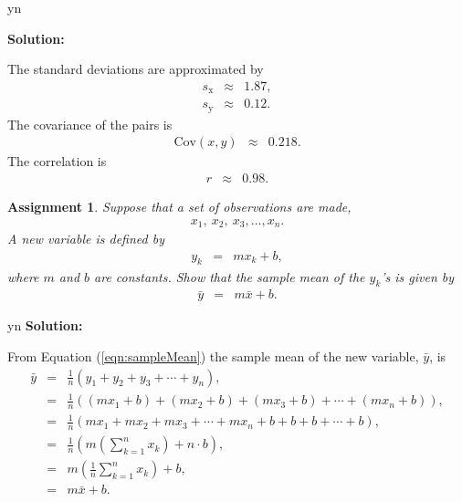 \documentclass[12pt]{article}
\def\solutions{y}
\def\solutions{n}
\newtheorem{assignment}{Assignment}[section]
\newcommand{\lp}{\left(}
\newcommand{\rp}{\right)}
\begin{document}
\if y\solutions

\textbf{Solution:}

The standard deviations are approximated by
\begin{eqnarray*}
  s_{\mathrm x} & \approx & 1.87, \\
  s_{\mathrm y} & \approx & 0.12.
\end{eqnarray*}
The covariance of the pairs is
\begin{eqnarray*}
  \mathrm{Cov}(x,y) & \approx & 0.218.
\end{eqnarray*}
The correlation is
\begin{eqnarray*}
  r & \approx & 0.98.
\end{eqnarray*}

\fi


\begin{assignment}
  Suppose that a set of observations are made,
  \begin{eqnarray*}
    x_1,~x_2,~x_3,\ldots,x_n.
  \end{eqnarray*}
  A new variable is defined by
  \begin{eqnarray*}
    y_k & = & m x_k + b,
  \end{eqnarray*}
  where $m$ and $b$ are constants. Show that the sample mean of the
  $y_k$'s is given by
  \begin{eqnarray*}
    \bar{y} & = & m \bar{x} + b.
  \end{eqnarray*}
\end{assignment}

\if y\solutions
\textbf{Solution:} 

From Equation (\ref{eqn:sampleMean}) the sample mean of the
new variable, $\bar{y}$, is
\begin{eqnarray*}
  \bar{y} & = & \frac{1}{n} (y_1 + y_2 + y_3 + \cdots + y_n), \\
  & = & \frac{1}{n} \lp (m x_1 + b) + (m x_2 + b) + (m x_3 + b) +
  \cdots + (m x_n + b) \rp, \\
  & = & \frac{1}{n} \lp m x_1 + m x_2 + m x_3 + \cdots + m x_n 
  + b + b + b + \cdots + b \rp, \\
  & = & \frac{1}{n} \lp m \lp \sum^n_{k=1} x_k \rp + n\cdot b \rp, \\
  & = & m \lp \frac{1}{n} \sum^n_{k=1} x_k \rp + b, \\
  & = & m \bar{x} + b.
\end{eqnarray*}

\fi
\end{document}
